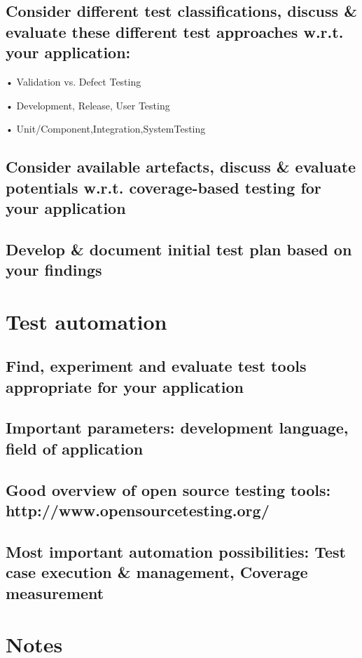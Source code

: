 \documentclass{scrartcl}
\begin{document}
\subsection{Consider different test classifications, discuss \& evaluate these different test approaches w.r.t. your application:}

• Validation vs. Defect Testing

• Development, Release, User Testing

• Unit/Component,Integration,SystemTesting

\subsection{Consider available artefacts, discuss \& evaluate potentials w.r.t. coverage-based testing for your application}

\subsection{Develop \& document initial test plan based on your findings}

\section{Test automation}

\subsection*{Find, experiment and evaluate test tools appropriate for your application}

\subsection*{Important parameters: development language, field of application}

\subsection*{Good overview of open source testing tools: http://www.opensourcetesting.org/}

\subsection*{Most important automation possibilities: Test case execution \& management, Coverage measurement}

\section{Notes}
\end{document}
